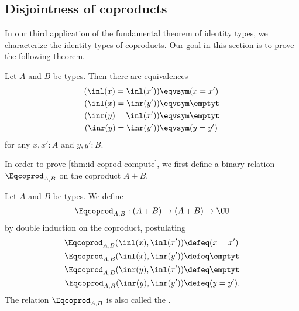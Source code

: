 \subsection{Disjointness of coproducts}

In our third application of the fundamental theorem of identity types, we characterize the identity types of coproducts. Our goal in this section is to prove the following theorem.

\begin{thm}\label{thm:id-coprod-compute}
Let $A$ and $B$ be types. Then there are equivalences
\begin{align*}
(\inl(x)=\inl(x')) & \eqvsym (x = x')\\
(\inl(x)=\inr(y')) & \eqvsym \emptyt \\
(\inr(y)=\inl(x')) & \eqvsym \emptyt \\
(\inr(y)=\inr(y')) & \eqvsym (y=y')
\end{align*}
for any $x,x':A$ and $y,y':B$.
\end{thm}

In order to prove \cref{thm:id-coprod-compute}, we first define
a binary relation $\Eqcoprod_{A,B}$ on the coproduct $A+B$.

\begin{defn}
Let $A$ and $B$ be types. We define
\begin{equation*}
\Eqcoprod_{A,B} : (A+B)\to (A+B)\to\UU
\end{equation*}
by double induction on the coproduct, postulating
\begin{align*}
\Eqcoprod_{A,B}(\inl(x),\inl(x')) & \defeq (x=x') \\
\Eqcoprod_{A,B}(\inl(x),\inr(y')) & \defeq \emptyt \\
\Eqcoprod_{A,B}(\inr(y),\inl(x')) & \defeq \emptyt \\
\Eqcoprod_{A,B}(\inr(y),\inr(y')) & \defeq (y=y').
\end{align*}
The relation $\Eqcoprod_{A,B}$ is also called the .
\end{defn}


